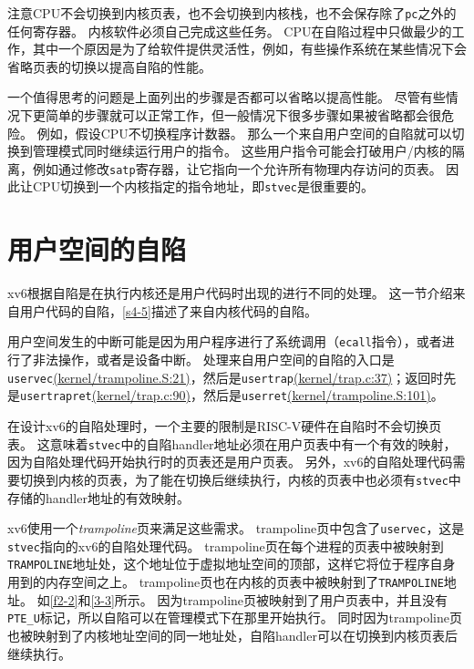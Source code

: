 注意CPU不会切换到内核页表，也不会切换到内核栈，也不会保存除了\texttt{pc}之外的任何寄存器。
内核软件必须自己完成这些任务。
CPU在自陷过程中只做最少的工作，其中一个原因是为了给软件提供灵活性，例如，有些操作系统在某些情况下会省略页表的切换以提高自陷的性能。

一个值得思考的问题是上面列出的步骤是否都可以省略以提高性能。
尽管有些情况下更简单的步骤就可以正常工作，但一般情况下很多步骤如果被省略都会很危险。
例如，假设CPU不切换程序计数器。
那么一个来自用户空间的自陷就可以切换到管理模式同时继续运行用户的指令。
这些用户指令可能会打破用户/内核的隔离，例如通过修改\texttt{satp}寄存器，让它指向一个允许所有物理内存访问的页表。
因此让CPU切换到一个内核指定的指令地址，即\texttt{stvec}是很重要的。

\section{用户空间的自陷}
xv6根据自陷是在执行内核还是用户代码时出现的进行不同的处理。
这一节介绍来自用户代码的自陷，\autoref{s4-5}描述了来自内核代码的自陷。

用户空间发生的中断可能是因为用户程序进行了系统调用（\texttt{ecall}指令），或者进行了非法操作，或者是设备中断。
处理来自用户空间的自陷的入口是\texttt{uservec}\href{https://github.com/mit-pdos/xv6-riscv/blob/risc/kernel/trampoline.S#L21}{(kernel/trampoline.S:21)}，然后是\texttt{usertrap}\href{https://github.com/mit-pdos/xv6-riscv/blob/risc/kernel/trap.c#L37}{(kernel/trap.c:37)}；返回时先是\texttt{usertrapret}\href{https://github.com/mit-pdos/xv6-riscv/blob/risc/kernel/trap.c#L90}{(kernel/trap.c:90)}，然后是\texttt{userret}\href{https://github.com/mit-pdos/xv6-riscv/blob/risc/kernel/trampoline.S#L101}{(kernel/trampoline.S:101)}。

在设计xv6的自陷处理时，一个主要的限制是RISC-V硬件在自陷时不会切换页表。
这意味着\texttt{stvec}中的自陷handler地址必须在用户页表中有一个有效的映射，因为自陷处理代码开始执行时的页表还是用户页表。
另外，xv6的自陷处理代码需要切换到内核的页表，为了能在切换后继续执行，内核的页表中也必须有\texttt{stvec}中存储的handler地址的有效映射。

xv6使用一个\emph{trampoline}页来满足这些需求。
trampoline页中包含了\texttt{uservec}，这是\texttt{stvec}指向的xv6的自陷处理代码。
trampoline页在每个进程的页表中被映射到\texttt{TRAMPOLINE}地址处，这个地址位于虚拟地址空间的顶部，这样它将位于程序自身用到的内存空间之上。
trampoline页也在内核的页表中被映射到了\texttt{TRAMPOLINE}地址。
如\autoref{f2-2}和\autoref{3-3}所示。
因为trampoline页被映射到了用户页表中，并且没有\texttt{PTE\_U}标记，所以自陷可以在管理模式下在那里开始执行。
同时因为trampoline页也被映射到了内核地址空间的同一地址处，自陷handler可以在切换到内核页表后继续执行。

